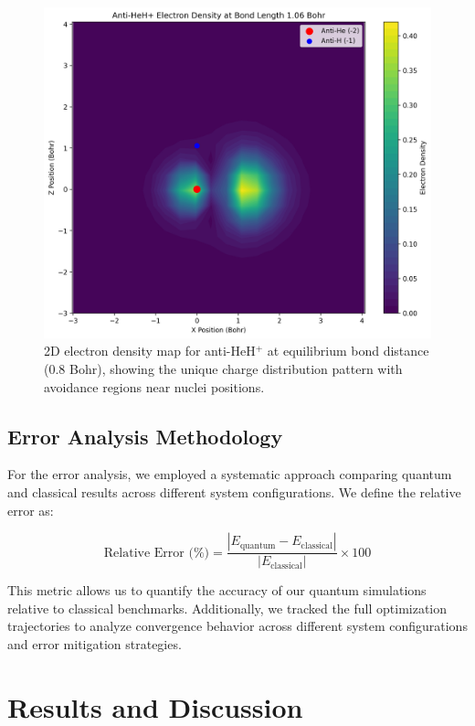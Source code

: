 \documentclass[10pt,twocolumn,a4paper]{article}
\begin{document}
\begin{figure}[t!]
    \centering
    \includegraphics[width=\columnwidth]{graphs/anti_heh_density_2d.png}
    \caption{2D electron density map for anti-HeH$^+$ at equilibrium bond distance (0.8 Bohr), showing the unique charge distribution pattern with avoidance regions near nuclei positions.}
    \label{fig:density_2d}
\end{figure}

\subsection{Error Analysis Methodology}
For the error analysis, we employed a systematic approach comparing quantum and classical results across different system configurations. We define the relative error as:

\begin{equation}
\text{Relative Error (\%)} = \frac{|E_{\text{quantum}} - E_{\text{classical}}|}{|E_{\text{classical}}|} \times 100
\end{equation}

This metric allows us to quantify the accuracy of our quantum simulations relative to classical benchmarks. Additionally, we tracked the full optimization trajectories to analyze convergence behavior across different system configurations and error mitigation strategies.

\section{Results and Discussion}
\end{document}
